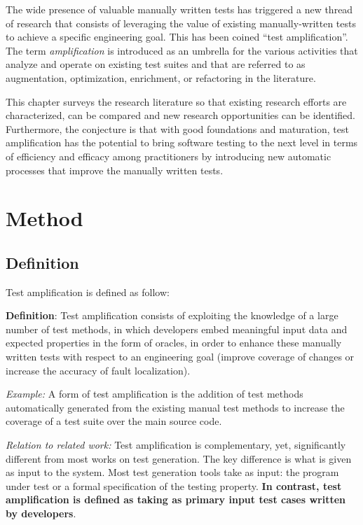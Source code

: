 The wide presence of valuable manually written tests has triggered a new thread of research that consists of leveraging the value of existing manually-written tests to achieve a specific engineering goal.
This has been coined ``test amplification''.
The term \emph{amplification} is introduced as an umbrella for the various activities that analyze and operate on existing test suites and that are referred to as augmentation, optimization, enrichment, or refactoring in the literature. 

This chapter surveys the research literature so that existing research efforts are characterized, can be compared and new research opportunities can be identified.
Furthermore, the conjecture is that with good foundations and maturation, test amplification has the potential to bring software testing to the next level in terms of efficiency and efficacy among practitioners by introducing new automatic processes that improve the manually written tests.

\section{Method}
\label{sec:sota:method}

\subsection{Definition}
\label{subsec:sota:method:definition}
Test amplification is defined as follow:

\begin{mdframed}
	\textbf{Definition}: Test amplification consists of exploiting the knowledge of a large number of test methods, in which developers embed meaningful input data and expected properties in the form of oracles, in order to enhance these manually written tests with respect to an engineering goal (\eg improve coverage of changes or increase the accuracy of fault localization).
\end{mdframed}

\emph{Example:} 
A form of test amplification is the addition of test methods automatically generated from the existing manual test methods to increase the coverage of a test suite over the main source code.

\emph{Relation to related work:} 
Test amplification is complementary, yet, significantly different from most works on test generation.
The key difference is what is given as input to the system.
Most test generation tools take as input:
the program under test or a formal specification of the testing property.
\textbf{In contrast, test amplification is defined as taking as primary input test cases written by developers}. 


